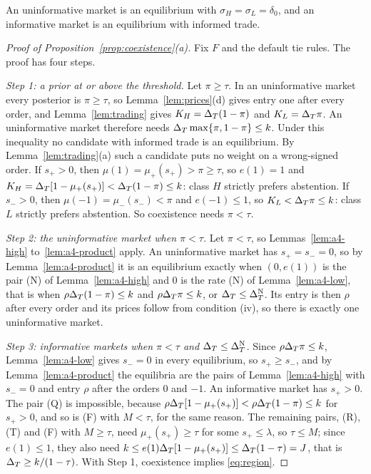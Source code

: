 An uninformative market is an equilibrium with \(\sigma_H=\sigma_L=\delta_0\), and an informative market is an equilibrium
with informed trade.

\begin{proof}[Proof of Proposition~\ref{prop:coexistence}(a)]
Fix \(F\) and the default tie rules. The proof has four steps.

\emph{Step 1: a prior at or above the threshold.} Let \(\pi\ge\tau\). In an uninformative market every posterior is
\(\pi\ge\tau\), so Lemma~\ref{lem:prices}(d) gives entry one after every order, and Lemma~\ref{lem:trading} gives
\(K_H=\Delta_T(1-\pi)\) and \(K_L=\Delta_T\pi\). An uninformative market therefore needs \(\Delta_T\max\{\pi,1-\pi\}\le k\). Under this
inequality no candidate with informed trade is an equilibrium. By Lemma~\ref{lem:trading}(a) such a candidate puts no
weight on a wrong-signed order. If \(s_+>0\), then \(\mu(1)=\mu_+(s_+)>\pi\ge\tau\), so \(e(1)=1\) and
\(K_H=\Delta_T[1-\mu_+(s_+)]<\Delta_T(1-\pi)\le k\): class \(H\) strictly prefers abstention. If \(s_->0\), then
\(\mu(-1)=\mu_-(s_-)<\pi\) and \(e(-1)\le1\), so \(K_L<\Delta_T\pi\le k\): class \(L\) strictly prefers abstention. So
coexistence needs \(\pi<\tau\).

\emph{Step 2: the uninformative market when \(\pi<\tau\).} Let \(\pi<\tau\), so Lemmas~\ref{lem:a4-high} to~\ref{lem:a4-product}
apply. An uninformative market has \(s_+=s_-=0\), so by Lemma~\ref{lem:a4-product} it is an equilibrium exactly when
\((0,e(1))\) is the pair (N) of Lemma~\ref{lem:a4-high} and \(0\) is the rate (N) of Lemma~\ref{lem:a4-low}, that is
when \(\rho\Delta_T(1-\pi)\le k\) and \(\rho\Delta_T\pi\le k\), or \(\Delta_T\le\Delta_T^{\rm N}\). Its entry is then \(\rho\) after every
order and its prices follow from condition (iv), so there is exactly one uninformative market.

\emph{Step 3: informative markets when \(\pi<\tau\) and \(\Delta_T\le\Delta_T^{\rm N}\).} Since \(\rho\Delta_T\pi\le k\),
Lemma~\ref{lem:a4-low} gives \(s_-=0\) in every equilibrium, so \(s_+\ge s_-\), and by Lemma~\ref{lem:a4-product} the
equilibria are the pairs of Lemma~\ref{lem:a4-high} with \(s_-=0\) and entry \(\rho\) after the orders \(0\) and
\(-1\). An informative market has \(s_+>0\). The pair (Q) is impossible, because
\(\rho\Delta_T[1-\mu_+(s_+)]<\rho\Delta_T(1-\pi)\le k\) for \(s_+>0\), and so is (F) with \(M<\tau\), for the same reason. The
remaining pairs, (R), (T) and (F) with \(M\ge\tau\), need \(\mu_+(s_+)\ge\tau\) for some \(s_+\le\lambda\), so
\(\tau\le M\); since \(e(1)\le1\), they also need \(k\le e(1)\Delta_T[1-\mu_+(s_+)]\le\Delta_T(1-\tau)=J\), that is
\(\Delta_T\ge k/(1-\tau)\). With Step 1, coexistence implies \eqref{eq:region}.


\end{proof}
